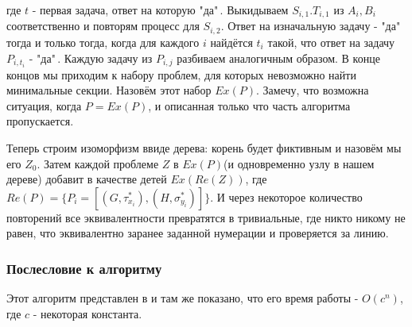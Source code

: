 где $t$ - первая задача, ответ на которую "да"\,. Выкидываем $S_{i, 1}. T_{i, 1}$ из $A_i, B_i$ соответственно и повторям процесс для $S_{i, 2}$. Ответ на изначальную задачу - "да"\, тогда и только тогда, когда для каждого $i$ найдётся $t_i$ такой, что ответ на задачу $P_{i, t_i}$ - "да"\,. Каждую задачу из $P_{i, j}$ разбиваем аналогичным образом. В конце концов мы приходим к набору проблем, для которых невозможно найти минимальные секции. Назовём этот набор $Ex(P)$. Замечу, что возможна ситуация, когда $P=Ex(P)$, и описанная только что часть алгоритма пропускается.

Теперь строим изоморфизм ввиде дерева: корень будет фиктивным и назовём мы его $Z_0$. Затем каждой проблеме $Z$ в $Ex(P)$(и одновременно узлу в нашем дереве) добавит в качестве детей $Ex(Re(Z))$, где $Re(P) = \{P_i=[(G, \tau_{x_i}^*), (H, \sigma_{y_i}^*)]\}$. И через некоторое количество повторений все эквивалентности превратятся в тривиальные, где никто никому не равен, что эквивалентно заранее заданной нумерации и проверяется за линию.

\subsubsection*{Послесловие к алгоритму}

Этот алгоритм представлен в \cite{14} и там же показано, что его время работы - $O(c^n)$, где $c$ - некоторая константа.
